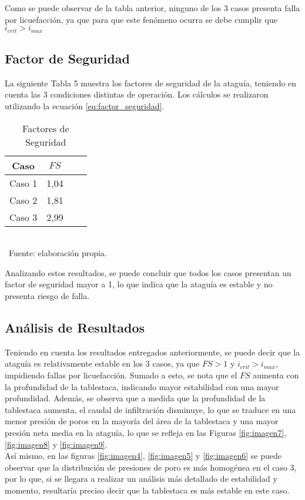 \documentclass{article} %
\begin{document}
Como se puede observar de la tabla anterior, ninguno de los 3 casos presenta falla por licuefacción, ya que para que este fenómeno ocurra se debe cumplir que $i_{crit}>i_{max}$

\subsection{Factor de Seguridad}

La siguiente Tabla 5 muestra los factores de seguridad de la ataguía, teniendo en cuenta las 3 condiciones distintas de operación. Los cálculos se realizaron utilizando la ecuación \ref{eq:factor_seguridad}.

\begin{table}[h!]
    \centering
    \caption{Factores de Seguridad}
    \begin{tabular}{|c|c|c|c|}
      \hline
      Caso & $FS$ \\
      \hline
      Caso 1 & 1,04 \\
      \hline
      Caso 2 & 1,81 \\
      \hline
      Caso 3 & 2,99 \\
      \hline
    \end{tabular}
    \footnotesize \\\ Fuente: elaboración propia.
    \label{tab5}
\end{table}

Analizando estos resultados, se puede concluir que todos los casos presentan un factor de seguridad mayor a 1, lo que indica que la ataguía es estable y no presenta riesgo de falla.

\subsection{Análisis de Resultados}

Teniendo en cuenta los resultados entregados anteriormente, se puede decir que la ataguía es relativamente estable en los 3 casos, ya que $FS > 1$ y $i_{crit} > i_{max}$, impidiendo fallas por licuefacción. Sumado a esto, se nota que el $FS$ aumenta con la profundidad de la tablestaca, indicando mayor estabilidad con una mayor profundidad. Además, se observa que a medida que la profundidad de la tablestaca aumenta, el caudal de infiltración disminuye, lo que se traduce en una menor presión de poros en la mayoría del área de la tablestaca y una mayor presión neta media en la ataguía, lo que se refleja en las Figuras \ref{fig:imagen7}, \ref{fig:imagen8} y \ref{fig:imagen9}.\\
Así mismo, en las figuras \ref{fig:imagen4}, \ref{fig:imagen5} y \ref{fig:imagen6} se puede observar que la distribución de presiones de poro es más homogénea en el caso 3, por lo que, si se llegara a realizar un análisis más detallado de estabilidad y momento, resultaría preciso decir que la tablestaca es más estable en este caso.
\end{document}
